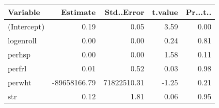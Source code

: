 \begin{tabular}{lrrrr}
  \hline
Variable & Estimate & Std..Error & t.value & Pr...t.. \\ 
  \hline
(Intercept) & 0.19 & 0.05 & 3.59 & 0.00 \\ 
  logenroll & 0.00 & 0.00 & 0.24 & 0.81 \\ 
  perhsp & 0.00 & 0.00 & 1.58 & 0.11 \\ 
  perfrl & 0.01 & 0.52 & 0.03 & 0.98 \\ 
  perwht & -89658166.79 & 71822510.31 & -1.25 & 0.21 \\ 
  str & 0.12 & 1.81 & 0.06 & 0.95 \\ 
   \hline
\end{tabular}
